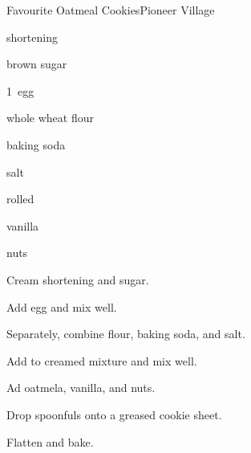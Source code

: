 \begin{recipe}{Favourite Oatmeal Cookies\FIXME}{Pioneer Village}{}

\begin{ingredients}
\item {} shortening
\item {} brown sugar
\item 1~egg
\item \C{1\half} whole wheat flour
\item {} baking soda
\item \tp{\quarter} salt
\item \C{1\half} rolled 
\item {} vanilla
\item \C{\quarter} nuts
\end{ingredients}

\begin{directions}
\item Cream shortening and sugar.
\item Add egg and mix well.
\item Separately, combine flour, baking soda, and salt.
\item Add to creamed mixture and mix well.
\item Ad oatmela, vanilla, and nuts.
\item Drop spoonfuls onto a greased cookie sheet.
\item Flatten and bake.
\end{directions}

\end{recipe}
